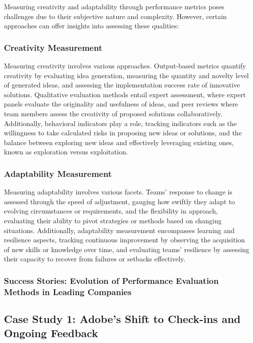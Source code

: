 \documentclass[a4paper, twoside]{article}
\begin{document}
Measuring creativity and adaptability through performance metrics poses challenges due to their subjective nature and complexity. However, certain approaches can offer insights into assessing these qualities:

\subsubsection{Creativity Measurement}

Measuring creativity involves various approaches. Output-based metrics quantify creativity by evaluating idea generation, measuring the quantity and novelty level of generated ideas, and assessing the implementation success rate of innovative solutions. Qualitative evaluation methods entail expert assessment, where expert panels evaluate the originality and usefulness of ideas, and peer reviews where team members assess the creativity of proposed solutions collaboratively. Additionally, behavioral indicators play a role, tracking indicators such as the willingness to take calculated risks in proposing new ideas or solutions, and the balance between exploring new ideas and effectively leveraging existing ones, known as exploration versus exploitation.

\subsubsection{Adaptability Measurement}

Measuring adaptability involves various facets. Teams' response to change is assessed through the speed of adjustment, gauging how swiftly they adapt to evolving circumstances or requirements, and the flexibility in approach, evaluating their ability to pivot strategies or methods based on changing situations. Additionally, adaptability measurement encompasses learning and resilience aspects, tracking continuous improvement by observing the acquisition of new skills or knowledge over time, and evaluating teams' resilience by assessing their capacity to recover from failures or setbacks effectively.



\subsubsection{Success Stories: Evolution of Performance Evaluation Methods in Leading Companies}

\subsection*{Case Study 1: Adobe's Shift to Check-ins and Ongoing Feedback}
\end{document}
